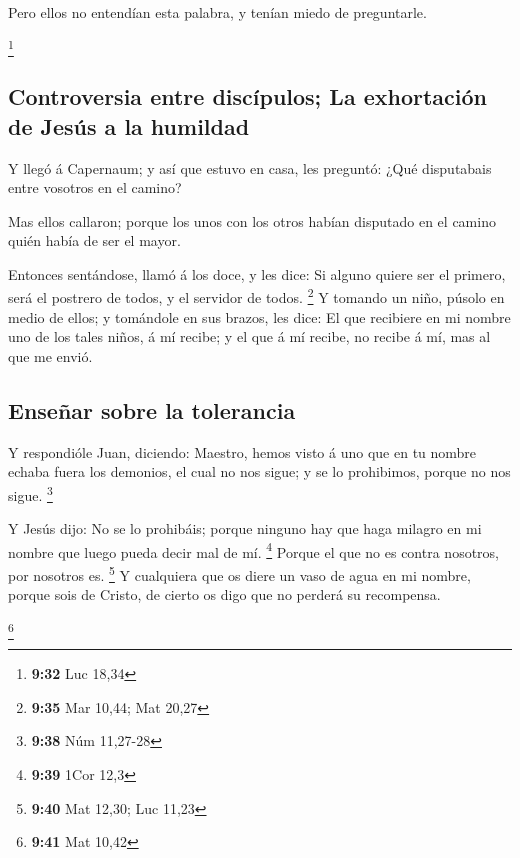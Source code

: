  Pero ellos no entendían esta palabra, y tenían miedo de
preguntarle.

\footnote{\textbf{9:32} Luc 18,34}

\hypertarget{controversia-entre-discuxedpulos-la-exhortaciuxf3n-de-jesuxfas-a-la-humildad}{%
\subsection{Controversia entre discípulos; La exhortación de Jesús a la
humildad}\label{controversia-entre-discuxedpulos-la-exhortaciuxf3n-de-jesuxfas-a-la-humildad}}

 Y llegó á Capernaum; y así que estuvo en casa, les
preguntó: ¿Qué disputabais entre vosotros en el camino?

 Mas ellos callaron; porque los unos con los otros habían
disputado en el camino quién había de ser el mayor.

 Entonces sentándose, llamó á los doce, y les dice: Si
alguno quiere ser el primero, será el postrero de todos, y el servidor
de todos. \footnote{\textbf{9:35} Mar 10,44; Mat 20,27} 
Y tomando un niño, púsolo en medio de ellos; y tomándole en sus brazos,
les dice:  El que recibiere en mi nombre uno de los tales
niños, á mí recibe; y el que á mí recibe, no recibe á mí, mas al que me
envió.

\hypertarget{enseuxf1ar-sobre-la-tolerancia}{%
\subsection{Enseñar sobre la
tolerancia}\label{enseuxf1ar-sobre-la-tolerancia}}

 Y respondióle Juan, diciendo: Maestro, hemos visto á uno
que en tu nombre echaba fuera los demonios, el cual no nos sigue; y se
lo prohibimos, porque no nos sigue. \footnote{\textbf{9:38} Núm 11,27-28}

 Y Jesús dijo: No se lo prohibáis; porque ninguno hay que
haga milagro en mi nombre que luego pueda decir mal de mí. \footnote{\textbf{9:39}
  1Cor 12,3}  Porque el que no es contra nosotros, por
nosotros es. \footnote{\textbf{9:40} Mat 12,30; Luc 11,23}
 Y cualquiera que os diere un vaso de agua en mi nombre,
porque sois de Cristo, de cierto os digo que no perderá su recompensa.

\footnote{\textbf{9:41} Mat 10,42}


